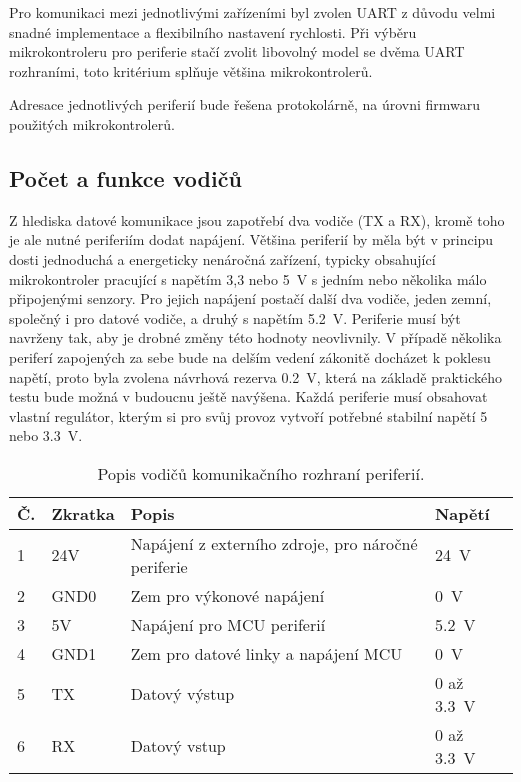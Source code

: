         Pro komunikaci mezi jednotlivými zařízeními byl zvolen UART z důvodu velmi snadné implementace a flexibilního nastavení rychlosti. Při výběru mikrokontroleru pro periferie stačí zvolit libovolný model se dvěma UART rozhraními, toto kritérium splňuje většina mikrokontrolerů.

        Adresace jednotlivých periferií bude řešena protokolárně, na úrovni firmwaru použitých mikrokontrolerů.


    \subsection{Počet a funkce vodičů}
        \label{subsec:pocet-a-fce-vodicu-sbernice}
        Z hlediska datové komunikace jsou zapotřebí dva vodiče (TX a RX), kromě toho je ale nutné periferiím dodat napájení. Většina periferií by měla být v principu dosti jednoduchá a energeticky nenáročná zařízení, typicky obsahující mikrokontroler pracující s napětím 3,3 nebo \qty{5}{V} s jedním nebo několika málo připojenými senzory. Pro jejich napájení postačí další dva vodiče, jeden zemní, společný i pro datové vodiče, a druhý s napětím \qty{5.2}{V}. Periferie musí být navrženy tak, aby je drobné změny této hodnoty neovlivnily. V případě několika periferí zapojených za sebe bude na delším vedení zákonitě docházet k poklesu napětí, proto byla zvolena návrhová rezerva \qty{0.2}{V}, která na základě praktického testu bude možná v budoucnu ještě navýšena. Každá periferie musí obsahovat vlastní regulátor, kterým si pro svůj provoz vytvoří potřebné stabilní napětí 5 nebo \qty{3,3}{V}. 
        \begin{table}[h!]
            \centering
            \caption{Popis vodičů komunikačního rozhraní periferií.}
            \label{tab:sbernice-popis-vodicu}
            \begin{tabular}{|l|l|l|l|}
                \hline
                \textbf{Č.} & \textbf{Zkratka} & \textbf{Popis} & \textbf{Napětí} \\
                \hline\hline
                1 & 24V & Napájení z externího zdroje, pro náročné periferie & \qty{24}{V} \\
                \hline
                2 & GND0 & Zem pro výkonové napájení & \qty{0}{V}\\
                \hline
                3 & 5V & Napájení pro MCU periferií & \qty{5.2}{V}\\
                \hline
                4 & GND1 & Zem pro datové linky a napájení MCU & \qty{0}{V}\\
                \hline
                5 & TX & Datový výstup & 0 až \qty{3.3}{V}\\
                \hline
                6 & RX & Datový vstup & 0 až \qty{3.3}{V}\\
                \hline
            \end{tabular}
        \end{table}

